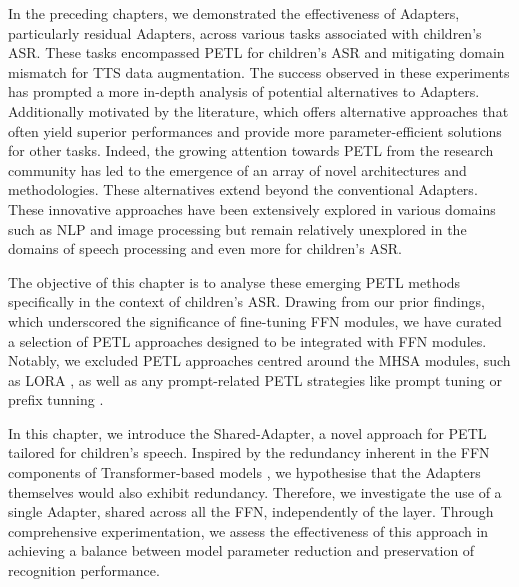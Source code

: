 \label{chap:7}
\cleardoublepage
In the preceding chapters, we demonstrated the effectiveness of Adapters, particularly residual Adapters, across various tasks associated with children's \ac{ASR}. These tasks encompassed \ac{PETL} for children's \ac{ASR} and mitigating domain mismatch for \ac{TTS} data augmentation. The success observed in these experiments has prompted a more in-depth analysis of potential alternatives to Adapters. Additionally motivated by the literature, which offers alternative approaches that often yield superior performances and provide more parameter-efficient solutions for other tasks.
Indeed, the growing attention towards \ac{PETL} from the research community has led to the emergence of an array of novel architectures and methodologies. These alternatives extend beyond the conventional Adapters. These innovative approaches have been extensively explored in various domains such as \ac{NLP} and image processing but remain relatively unexplored in the domains of speech processing \cite{chen2023exploring} and even more for children's \ac{ASR}.

The objective of this chapter is to analyse these emerging \ac{PETL} methods specifically in the context of children's \ac{ASR}. Drawing from our prior findings, which underscored the significance of fine-tuning \ac{FFN} modules, we have curated a selection of \ac{PETL} approaches designed to be integrated with \ac{FFN} modules. Notably, we excluded \ac{PETL} approaches centred around the \ac{MHSA} modules, such as LORA \cite{hu2022lora}, as well as any prompt-related \ac{PETL} strategies like prompt tuning \cite{lester-etal-2021-power} or prefix tunning \cite{li-liang-2021-prefix}.

In this chapter, we introduce the Shared-Adapter, a novel approach for \ac{PETL} tailored for children's speech. Inspired by the redundancy inherent in the \ac{FFN} components of Transformer-based models \cite{pires2023one}, we hypothesise that the Adapters themselves would also exhibit redundancy. Therefore, we investigate the use of a single Adapter, shared across all the \ac{FFN}, independently of the layer. Through comprehensive experimentation, we assess the effectiveness of this approach in achieving a balance between model parameter reduction and preservation of recognition performance.

